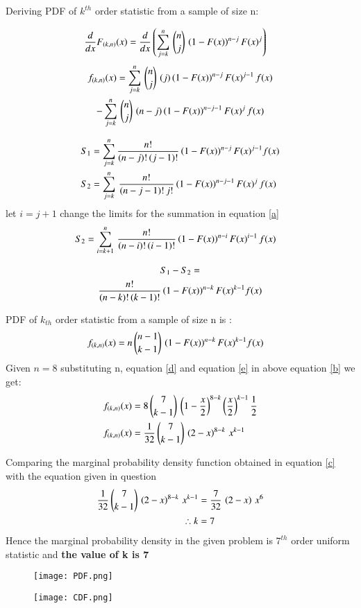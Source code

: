 \documentclass[journal,12pt,twocolumn]{IEEEtran}
\begin{document}
Deriving PDF of $k^{th}$ order statistic from a sample of size n:
 
 \begin{align}
\nonumber \dfrac{d}{dx} F_{(k,n)}(x) &= \dfrac{d}{dx}\left(\displaystyle\sum_{j=k}^{n}\,{n \choose j}\,\left(1-F(x)\right)^{n-j} F(x)^{j}\right) 
 \end{align}
\begin{multline}
\nonumber f_{(k,n)}(x) = \displaystyle\sum_{j=k}^{n}\,{n \choose j}\,\left(j\right)\left(1-F(x)\right)^{n-j}F(x)^{j-1}\,f(x)  \\
                -\displaystyle\sum_{j=k}^{n}\,{n \choose j}\,\left(n-j\right)\left(1-F(x)\right)^{n-j-1}F(x)^{j}\,f(x) 
\end{multline}

\begin{align}
S_1  &= \displaystyle\sum_{j=k}^{n} \dfrac{n!}{(n-j)!\,(j-1)!}\left(1-F(x)\right)^{n-j}F(x)^{j-1} f(x) \\
S_2  &= \displaystyle\sum_{j=k}^{n}\,\dfrac{n!}{(n-j-1)!\,j!}\left(1-F(x)\right)^{n-j-1}F(x)^{j}\,f(x) \label{a}
\end{align}
let $i = j+1$ change the limits for the summation in equation \eqref{a}
\begin{align}
\nonumber S_2  &= \displaystyle\sum_{i=k+1}^{n}\,\dfrac{n!}{(n-i)!\,(i-1)!}\left(1-F(x)\right)^{n-i}F(x)^{i-1}\,f(x)  
\end{align}

\newpage

\begin{multline}
S_1 - S_2  =  \\
           \dfrac{n!}{(n-k)!\,(k-1)!}\left(1-F(x)\right)^{n-k}F(x)^{k-1} f(x) 
\end{multline}
 \null \par
 PDF of $k_{th}$ order statistic from a sample of size n is :
\begin{align}
f_{(k,n)}(x) &= n\,{n-1 \choose k-1}\,\left(1-F(x)\right)^{n-k}F(x)^{k-1} f(x) \label{b}
\end{align}
Given $n=8$ substituting n, equation \eqref{d} and equation \eqref{e}  in above equation \eqref{b} we get:
\begin{align}
\nonumber f_{(k,n)}(x) &= 8\,{7 \choose k-1}\,\left(1-\dfrac{x}{2}\right)^{8-k}\left(\dfrac{x}{2}\right)^{k-1} \dfrac{1}{2} \\
f_{(k,n)}(x) &= \dfrac{1}{32}\,{7 \choose k-1}\,\left(2-x\right)^{8-k}\,x^{k-1} \label{c} 
\end{align}

Comparing the marginal probability density function obtained in equation \eqref{c} with the equation given in question
\begin{align}
\nonumber \dfrac{1}{32}\,{7 \choose k-1}\,\left(2-x\right)^{8-k}\,x^{k-1} &= \dfrac{7}{32}\,\left(2-x\right)\,x^6 \\
\therefore k &= 7 
\end{align}
Hence the marginal probability density in the given problem is $7^{th}$ order uniform statistic and \textbf{the value of k is 7} 

\begin{figure}[htp]
    \centering
    \texttt{[image: PDF.png]}
    \label{fig:PDF  of X}
\end{figure}
\newpage
\begin{figure}[htp]
    \centering
    \texttt{[image: CDF.png]}
    \label{fig:CDF of X}
\end{figure}
\end{document}
